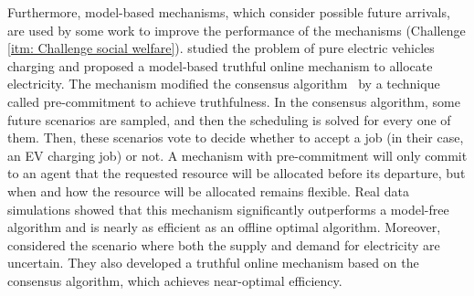 \documentclass[11pt]{phdthesis}
\begin{document}
Furthermore, model-based mechanisms, which consider possible future arrivals, are used by some work to improve the performance of the mechanisms (Challenge \ref{itm: Challenge social welfare}).  \citet{stein2012model} studied the problem of pure electric vehicles charging and proposed a model-based truthful online mechanism to allocate electricity. The mechanism modified the consensus algorithm~\citep{bent2004value} by a technique called pre-commitment to achieve truthfulness. 
In the consensus algorithm, some future scenarios are sampled, and then the scheduling is solved for every one of them. Then, these scenarios vote to decide whether to accept a job (in their case, an EV charging job) or not. 
A mechanism with pre-commitment will only commit to an agent that the requested resource will be allocated before its departure, but when and how the resource will be allocated remains flexible. Real data simulations showed that this mechanism significantly outperforms a model-free algorithm and is nearly as efficient as an offline optimal algorithm. Moreover, \citet{strohle2014online} considered the scenario where both the supply and demand for electricity are uncertain. They also developed a truthful online mechanism based on the consensus algorithm, which achieves near-optimal efficiency. 

\end{document}
